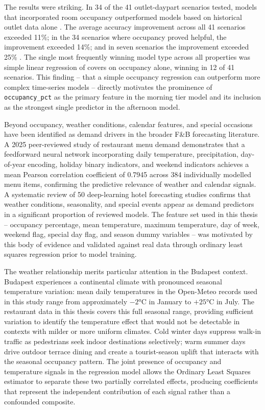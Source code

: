 \documentclass[12pt,a4paper,oneside]{article}
\begin{document}
The results were striking. In 34 of the 41 outlet-daypart scenarios tested, models that incorporated room occupancy outperformed models based on historical outlet data alone \citep{thompson2008}. The average accuracy improvement across all 41 scenarios exceeded 11\%; in the 34 scenarios where occupancy proved helpful, the improvement exceeded 14\%; and in seven scenarios the improvement exceeded 25\% \citep{thompson2008}. The single most frequently winning model type across all properties was simple linear regression of covers on occupancy alone, winning in 12 of 41 scenarios. This finding -- that a simple occupancy regression can outperform more complex time-series models -- directly motivates the prominence of \texttt{occupancy\_pct} as the primary feature in the morning tier model and its inclusion as the strongest single predictor in the afternoon model.


Beyond occupancy, weather conditions, calendar features, and special occasions have been identified as demand drivers in the broader F\&B forecasting literature. A 2025 peer-reviewed study of restaurant menu demand \citep{pmc2025} demonstrates that a feedforward neural network incorporating daily temperature, precipitation, day-of-year encoding, holiday binary indicators, and weekend indicators achieves a mean Pearson correlation coefficient of 0.7945 across 384 individually modelled menu items, confirming the predictive relevance of weather and calendar signals. A systematic review of 50 deep-learning hotel forecasting studies \citep{heliyon2023} confirms that weather conditions, seasonality, and special events appear as demand predictors in a significant proportion of reviewed models. The feature set used in this thesis -- occupancy percentage, mean temperature, maximum temperature, day of week, weekend flag, special day flag, and season dummy variables -- was motivated by this body of evidence and validated against real data through ordinary least squares regression prior to model training.

The weather relationship merits particular attention in the Budapest context. Budapest experiences a continental climate with pronounced seasonal temperature variation: mean daily temperatures in the Open-Meteo records used in this study range from approximately $-2$°C in January to $+25$°C in July. The restaurant data in this thesis covers this full seasonal range, providing sufficient variation to identify the temperature effect that would not be detectable in contexts with milder or more uniform climates. Cold winter days suppress walk-in traffic as pedestrians seek indoor destinations selectively; warm summer days drive outdoor terrace dining and create a tourist-season uplift that interacts with the seasonal occupancy pattern. The joint presence of occupancy and temperature signals in the regression model allows the Ordinary Least Squares estimator to separate these two partially correlated effects, producing coefficients that represent the independent contribution of each signal rather than a confounded composite.
\end{document}
